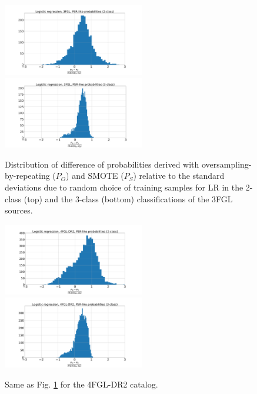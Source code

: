 \begin{figure}[h]
\centering
\hspace*{-0.5cm}
\includegraphics[width=0.55\textwidth]{plots/hist_diff_smote_LR_3FGL_2class.pdf}
\hspace*{-0.5cm}
\includegraphics[width=0.55\textwidth]{plots/hist_diff_smote_LR_3FGL_3class.pdf}
\caption{Distribution of difference  of probabilities derived with oversampling-by-repeating ($P_O$) and SMOTE ($P_S$) 
relative to the standard deviations due to random choice of training samples
for LR in the 2-class (top) and the 3-class (bottom) classifications of the 3FGL sources.
}
\label{fig:OvsS_3FGL_PSR}
\end{figure}

\begin{figure}[h]
\centering
\hspace*{-0.5cm}
\includegraphics[width=0.55\textwidth]{plots/hist_diff_smote_LR_4FGL-DR2_2class.pdf}
\hspace*{-0.5cm}
\includegraphics[width=0.55\textwidth]{plots/hist_diff_smote_LR_4FGL-DR2_3class.pdf}
\caption{Same as Fig. \ref{fig:OvsS_3FGL_PSR} for the 4FGL-DR2 catalog.
}
\label{fig:OvsS_4FGL_PSR}
\end{figure}


